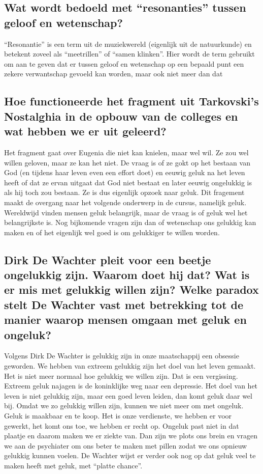 \documentclass[11pt,a4paper,titlepage]{article}
\begin{document}
\subsection{Wat wordt bedoeld met “resonanties” tussen geloof en wetenschap? }
 “Resonantie” is een term uit de muziekwereld (eigenlijk uit de natuurkunde) en betekent zoveel als
“meetrillen” of “samen klinken”. Hier wordt de term gebruikt om aan te
geven dat er tussen geloof en wetenschap op een bepaald punt een
zekere verwantschap gevoeld kan worden, maar ook niet meer dan dat

\subsection{Hoe functioneerde het fragment uit Tarkovski’s Nostalghia in de opbouw van de colleges en wat hebben we er uit geleerd?}
Het fragment gaat over Eugenia die niet kan knielen, maar wel wil. Ze zou wel willen geloven, maar ze kan het niet. De vraag is of ze gokt op het bestaan van God (en tijdens haar leven even een effort doet) en eeuwig geluk na het leven heeft of dat ze ervan uitgaat dat God niet bestaat en later eeuwig ongelukkig is als hij toch zou bestaan. Ze is dus eigenlijk opzoek naar geluk. Dit fragement maakt de overgang naar het volgende onderwerp in de cursus, namelijk geluk. Wereldwijd vinden mensen geluk belangrijk, maar de vraag is of geluk wel het belangrijkste is. Nog bijkomende vragen zijn dan of wetenschap ons gelukkig kan maken en of het eigenlijk wel goed is om gelukkiger te willen worden.

\subsection{Dirk De Wachter pleit voor een beetje ongelukkig zijn. Waarom doet hij dat? Wat is er mis met gelukkig willen zijn? Welke paradox stelt De Wachter vast met betrekking tot de manier waarop mensen omgaan met geluk en ongeluk? }
Volgens Dirk De Wachter is gelukkig zijn in onze maatschappij een obsessie geworden. We hebben van extreem gelukkig zijn het doel van het leven gemaakt. Het is niet meer normaal hoe gelukkig we willen zijn. Dat is een vergissing. Extreem geluk najagen is de koninklijke weg naar een depressie. Het doel van het leven is niet gelukkig zijn, maar een goed leven leiden, dan komt geluk daar wel bij. Omdat we zo gelukkig willen zijn, kunnen we niet meer om met ongeluk. Geluk is
maakbaar en te koop. Het is onze verdienste, we hebben er voor gewerkt, het komt ons toe, we hebben er recht op. Ongeluk past niet in dat plaatje en daarom maken we er ziekte van. Dan zijn we plots ons brein en vragen we aan de psychiater om ons beter te maken met pillen zodat we ons opnieuw gelukkig kunnen voelen. De Wachter wijst er verder ook nog op dat geluk veel te maken heeft met geluk, met “platte chance”.
\end{document}

